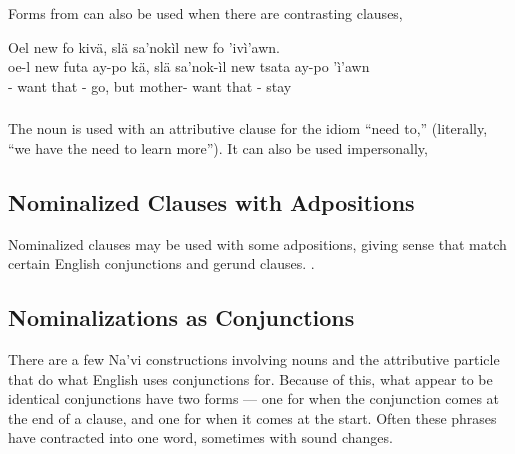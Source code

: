 Forms from  can also be used when there are contrasting
clauses,

\begin{interlin}
\glll Oel new  fo kivä, slä sa'nokìl new  fo 'ivì'awn. \\
    oe-l new futa ay-po kä, slä sa'nok-ìl new tsata ay-po 'ì'awn\\
  - want that - go,
    but mother- want that - stay \\
\end{interlin}

\subsubsection{} The noun   is used with an
attributive clause for the idiom ``need to,''   (literally, ``we have the need
to learn more''). 
It can also be used impersonally,  


\subsection{Nominalized Clauses with Adpositions} Nominalized clauses
may be used with some adpositions, giving sense that match certain
English conjunctions and gerund clauses.   .\label{syn:rel:nom-adp}


\subsection{Nominalizations as Conjunctions} There are a few Na'vi
constructions involving nouns and the attributive particle that do
what English uses conjunctions for.  Because of this, what appear to
be identical conjunctions have two forms --- one for when the
conjunction comes at the end of a clause, and one for when it comes at
the start.  Often these phrases have contracted into one word,
sometimes with sound changes.

